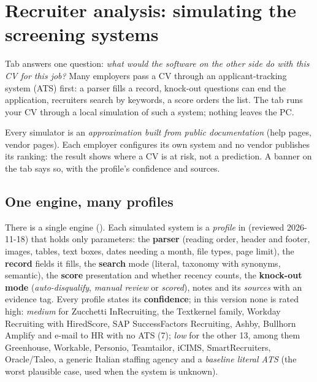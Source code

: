 \chapter{Recruiter analysis: simulating the screening systems}\label{ch:analysis}

Tab  answers one question: \emph{what would the software on the other side do
with this CV for this job?} Many employers pass a CV through an applicant-tracking system (ATS) first: a
parser fills a record, knock-out questions can end the application, recruiters search by keywords, a score
orders the list. The tab runs your CV through a local simulation of such a system; nothing leaves the PC.

\begin{warnbox}
Every simulator is an \emph{approximation built from public documentation} (help pages, vendor pages).
Each employer configures its own system and no vendor publishes its ranking: the result shows where a CV is
at risk, not a prediction. A banner on the tab says so, with the profile's confidence and sources.
\end{warnbox}

\section{One engine, many profiles}
There is a single engine (). Each simulated system is a \emph{profile} in
 (reviewed 2026-11-18) that holds only parameters: the
\textbf{parser} (reading order, header and footer, images, tables, text boxes, dates needing a month, file
types, page limit), the \textbf{record} fields it fills, the \textbf{search} mode (literal, taxonomy with
synonyms, semantic), the \textbf{score} presentation and whether recency counts, the \textbf{knock-out mode}
(\emph{auto-disqualify}, \emph{manual review} or \emph{scored}), notes and its \emph{sources} with an evidence
tag. Every profile states its \textbf{confidence}; in this version none is rated high:
\emph{medium} for Zucchetti InRecruiting, the Textkernel family, Workday Recruiting with HiredScore, SAP
SuccessFactors Recruiting, Ashby, Bullhorn Amplify and e-mail to HR with no ATS (7); \emph{low} for the other
13, among them Greenhouse, Workable, Personio, Teamtailor, iCIMS, SmartRecruiters, Oracle/Taleo, a generic
Italian staffing agency and a \emph{baseline literal ATS} (the worst plausible case, used when the system
is unknown).

